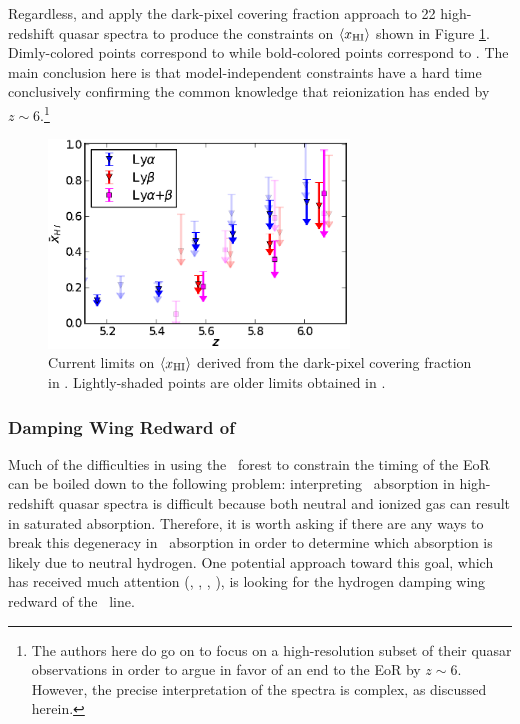Regardless, \cite{McGreer:2011dm} and \cite{McGreer:2014qwa} apply the dark-pixel covering fraction approach to 22 high-redshift quasar spectra to produce the constraints on $\langle x_{\text{HI}}\rangle$ shown in Figure \ref{fig:McGreer}. Dimly-colored points correspond to \cite{McGreer:2011dm} while bold-colored points correspond to \cite{McGreer:2014qwa}. The main conclusion here is that model-independent constraints have a hard time conclusively confirming the common knowledge that reionization has ended by $z \sim 6$.\footnote{The authors here do go on to focus on a high-resolution subset of their quasar observations in order to argue in favor of an end to the EoR by $z \sim 6$. However, the precise interpretation of the spectra is complex, as discussed herein.} 

\begin{figure}[h]
  \centering
  \includegraphics[width=8cm]{xhi_newdata.eps}
  \caption{Current limits on $\langle x_{\text{HI}}\rangle$ derived from the dark-pixel covering fraction in \cite{McGreer:2014qwa}. Lightly-shaded points are older limits obtained in \cite{McGreer:2011dm}.}
  \label{fig:McGreer}
\end{figure}



\subsubsection{Damping Wing Redward of \lya}

Much of the difficulties in using the \lya\ forest to constrain the timing of the EoR can be boiled down to the following problem: interpreting \lya\ absorption in high-redshift quasar spectra is difficult because both neutral and ionized gas can result in saturated absorption. Therefore, it is worth asking if there are any ways to break this degeneracy in \lya\ absorption in order to determine which absorption is likely due to neutral hydrogen. One potential approach toward this goal, which has received much attention (\cite{Chornock:2013una}, \cite{Chornock:2014fva}, \cite{Mortlock2011}, \cite{Bolton:2011vb}), is looking for the hydrogen damping wing redward of the \lya\ line. 


